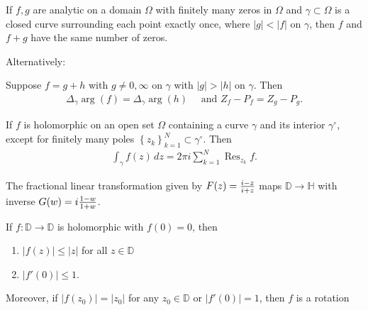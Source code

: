 \begin{theorem}\label{Rouche}

If \(f, g\) are analytic on a domain \(\Omega\) with finitely many zeros
in \(\Omega\) and \(\gamma \subset \Omega\) is a closed curve
surrounding each point exactly once, where
\({\left\lvert {g} \right\rvert} < {\left\lvert {f} \right\rvert}\) on
\(\gamma\), then \(f\) and \(f+g\) have the same number of zeros.

Alternatively:

Suppose \(f = g + h\) with \(g \neq 0, \infty\) on \(\gamma\) with
\({\left\lvert {g} \right\rvert} > {\left\lvert {h} \right\rvert}\) on
\(\gamma\). Then
\begin{align*}\Delta_\gamma \arg(f) = \Delta_\gamma \arg(h)\quad\text{ and } Z_f - P_f = Z_g - P_g.\end{align*}

\end{theorem}

\begin{theorem}

If \(f\) is holomorphic on an open set \(\Omega\) containing a curve
\(\gamma\) and its interior \(\gamma^\circ\), except for finitely many
poles \(\left\{{z_k}\right\}_{k=1}^N \subset \gamma^\circ\). Then
\begin{align*}  
\int_\gamma f(z) \,dz = 2\pi i \sum_{k=1}^N \mathop{\mathrm{Res}}_{z_k} f
.\end{align*}

\end{theorem}

\begin{theorem}

The fractional linear transformation given by
\(F(z) = {i - z \over i + z}\) maps \({\mathbb{D}}\to {\mathbb{H}}\)
with inverse \(G(w) = i {1-w \over 1 + w}\).

\end{theorem}

\begin{theorem}\label{SchwarzLemma}

If \(f: {\mathbb{D}}\to {\mathbb{D}}\) is holomorphic with \(f(0) = 0\),
then

\begin{enumerate}
\def\labelenumi{\arabic{enumi}.}
\tightlist
\item
  \({\left\lvert {f(z)} \right\rvert} \leq {\left\lvert {z} \right\rvert}\)
  for all \(z\in {\mathbb{D}}\)
\item
  \({\left\lvert {f'(0)} \right\rvert} \leq 1\).
\end{enumerate}

Moreover, if
\({\left\lvert {f(z_0)} \right\rvert} = {\left\lvert {z_0} \right\rvert}\)
for any \(z_0\in {\mathbb{D}}\) or
\({\left\lvert {f'(0)} \right\rvert} = 1\), then \(f\) is a rotation

\end{theorem}


